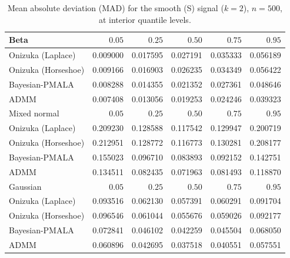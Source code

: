 \begin{table}[!htbp]
\centering
\small
\caption{Mean absolute deviation (MAD) for the smooth (S) signal ($k=2$), $n=500$, at interior quantile levels.}
\label{tab:s_int_mad}
\begin{tabular}{lrrrrr}
\toprule
Beta & $0.05$ & $0.25$ & $0.50$ & $0.75$ & $0.95$ \\
\midrule
Onizuka (Laplace) & 0.009000 & 0.017595 & 0.027191 & 0.035333 & 0.056189 \\
Onizuka (Horseshoe) & 0.009166 & 0.016903 & 0.026235 & 0.034349 & 0.056422 \\
Bayesian-PMALA & 0.008288 & 0.014355 & 0.021352 & 0.027361 & 0.048646 \\
ADMM & 0.007408 & 0.013056 & 0.019253 & 0.024246 & 0.039323 \\
\midrule
Mixed normal & $0.05$ & $0.25$ & $0.50$ & $0.75$ & $0.95$ \\
\midrule
Onizuka (Laplace) & 0.209230 & 0.128588 & 0.117542 & 0.129947 & 0.200719 \\
Onizuka (Horseshoe) & 0.212951 & 0.128772 & 0.116773 & 0.130281 & 0.208177 \\
Bayesian-PMALA & 0.155023 & 0.096710 & 0.083893 & 0.092152 & 0.142751 \\
ADMM & 0.134511 & 0.082435 & 0.071963 & 0.081493 & 0.118870 \\
\midrule
Gaussian & $0.05$ & $0.25$ & $0.50$ & $0.75$ & $0.95$ \\
\midrule
Onizuka (Laplace) & 0.093516 & 0.062130 & 0.057391 & 0.060291 & 0.091704 \\
Onizuka (Horseshoe) & 0.096546 & 0.061044 & 0.055676 & 0.059026 & 0.092177 \\
Bayesian-PMALA & 0.072841 & 0.046102 & 0.042259 & 0.045504 & 0.068050 \\
ADMM & 0.060896 & 0.042695 & 0.037518 & 0.040551 & 0.057551 \\
\bottomrule
\end{tabular}
\end{table}
